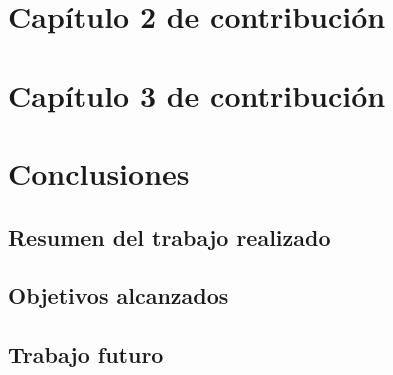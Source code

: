 \documentclass[11pt,spanish,listoffigures,listoftables]{tfgetsinf}
\begin{document}
\cleardoublepage


\chapter{Capítulo 2 de contribución}   %


\chapter{Capítulo 3 de contribución}   %


\chapter{Conclusiones}  %

\section{Resumen del trabajo realizado} %

\section{Objetivos alcanzados}         %

\section{Trabajo futuro}               %

\end{document}
